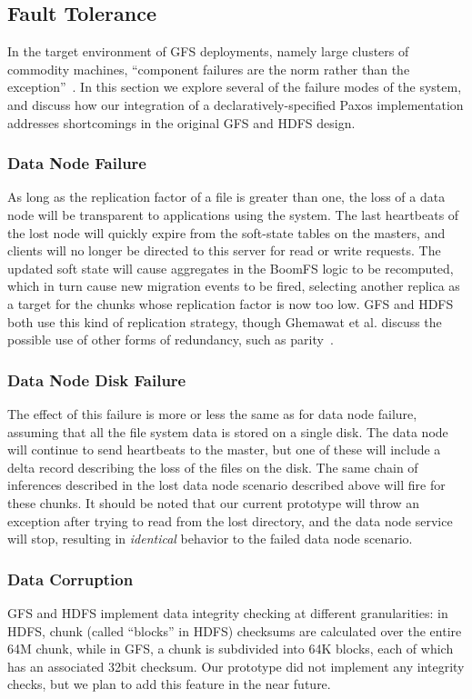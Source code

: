 \documentclass[twocolumn]{article}
\begin{document}
\subsection{Fault Tolerance}
In the target environment of GFS deployments, namely large clusters of
commodity machines, ``component failures are the norm rather than the
exception''~\cite{gfs}.  In this section we explore several of the
failure modes of the system, and discuss how our integration of a
declaratively-specified Paxos implementation addresses shortcomings in
the original GFS and HDFS design.

\subsubsection{Data Node Failure}
As long as the replication factor of a file is greater than one, the
loss of a data node will be transparent to applications using the
system.  The last heartbeats of the lost node will quickly expire from
the soft-state tables on the masters, and clients will no longer be
directed to this server for read or write requests.  The updated soft
state will cause aggregates in the BoomFS logic to be recomputed, which
in turn cause new migration events to be fired, selecting another
replica as a target for the chunks whose replication factor is now too
low.  GFS and HDFS both use this kind of replication strategy, though
Ghemawat et al. discuss the possible use of other forms of redundancy,
such as parity~\cite{gfs}.

\subsubsection{Data Node Disk Failure}
The effect of this failure is more or less the same as for data node
failure, assuming that all the file system data is stored on a single
disk.  The data node will continue to send heartbeats to the master,
but one of these will include a delta record describing the loss of
the files on the disk.  The same chain of inferences described in the
lost data node scenario described above will fire for these chunks.
It should be noted that our current prototype will throw an exception
after trying to read from the lost directory, and the data node
service will stop, resulting in \emph{identical} behavior to the
failed data node scenario.

\subsubsection{Data Corruption}
GFS and HDFS implement data integrity checking at different
granularities: in HDFS, chunk (called ``blocks'' in HDFS) checksums
are calculated over the entire 64M chunk, while in GFS, a chunk is
subdivided into 64K blocks, each of which has an associated 32bit
checksum.  Our prototype did not implement any integrity checks, but
we plan to add this feature in the near future.
\end{document}
